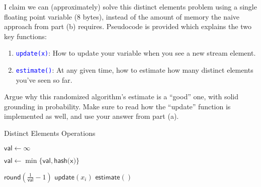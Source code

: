 \documentclass[12pt]{article}
\def\code#1{\textcolor{blue}{\texttt{#1}}}
\renewcommand{\|}{\mid}
\begin{document}
\begin{enumerate}
\begin{enumerate}
 I claim we can (approximately) solve this distinct elements problem using a single floating point variable (8 bytes), instead of the amount of memory the naive approach from part (b) requires. Pseudocode is provided which explains the two key functions:
    \begin{enumerate}
        \item \code{update(x)}: How to update your variable when you see a new stream element.
        \item \code{estimate()}: At any given time, how to estimate how many distinct elements you've seen so far.
    \end{enumerate}
    Argue why this randomized algorithm's estimate is a ``good'' one, with solid grounding in probability. Make sure to read how the ``update'' function is implemented as well, and use your answer from part (a).
    
    

    \begin{algorithm}
\caption{Distinct Elements Operations}
\begin{algorithmic}
\State $\textsf{val}\gets\infty$
\EndFunction

\State $\textsf{val}\gets \min{\{\textsf{val}, \textsf{hash(x)}\}}$
\EndFunction


\Return $\textsf{round}\left(\frac{1}{\textsf{val}}-1\right)$
\EndFunction
{} 
\State $\textsf{update}(x_i)$ 
\EndFor
\Return $\textsf{estimate}()$  

\end{algorithmic}
\end{algorithm}


\end{enumerate}
\end{enumerate}
\end{document}
